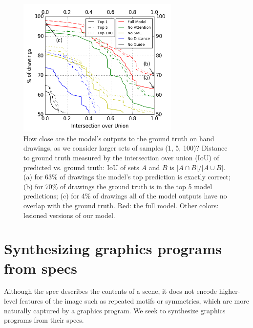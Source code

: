 \documentclass{article}
\theoremstyle{definition}
\begin{document}
\begin{figure}[h]\centering
  \begin{minipage}[c]{0.57\textwidth} 
    \centering  \includegraphics[width = 8cm]{figures/drawingAccuracy.png}            \vspace{-0.5cm}
  \end{minipage}\hfill%
      \begin{minipage}[c]{0.4\textwidth} 
  \caption{How close are the model's outputs to the ground truth on hand drawings, as we consider larger sets of samples (1, 5, 100)?
    Distance to ground truth measured by the intersection over union (IoU) of predicted vs. ground truth: IoU of sets $A$ and $B$ is $|A\cap B|/|A\cup B|$. (a) for 63\% of drawings the model's top prediction is exactly correct; (b) for 70\% of drawings the ground truth is in the top 5 model predictions; (c) for 4\% of drawings all of the model outputs have no overlap with the ground truth. Red: the full model. Other colors: lesioned versions of our model.}\label{drawingIntersectionOverUnion}            \vspace{-0.5cm}
      \end{minipage}

\end{figure}






\section{Synthesizing graphics programs from specs}\label{programSynthesisSection}
Although the spec describes the contents
of a scene, it does not encode higher-level features of the image
such as repeated motifs or symmetries, which are more naturally captured by a graphics program.
We seek to synthesize graphics programs from their specs.
\end{document}
